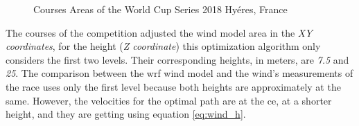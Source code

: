 \begin{figure} [hbt!]
  \centering
  \hfill
  \caption{Courses Areas of the World Cup Series 2018 Hyéres, France} %
\label{fig:course_area}
\end{figure}

The courses of the competition adjusted the wind model area in the \textit{XY coordinates}, for the height (\textit{Z coordinate}) this optimization algorithm only considers the first two levels. Their corresponding heights, in meters, are \textit{7.5} and \textit{25}. %
The comparison between the \acrshort{wrf} wind model and the wind's measurements of the race uses only the first level because both heights are approximately at the same. However, the velocities for the optimal path are at the \acrshort{ce}, at a shorter height, and they are getting using equation \ref{eq:wind_h}. \par  

